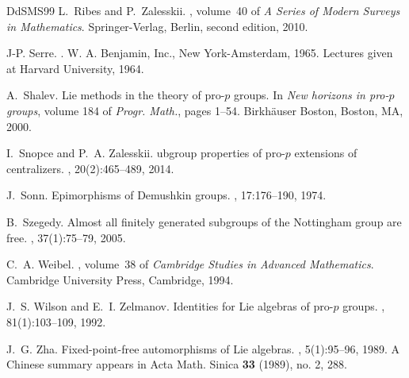 \documentclass[a4paper,10pt]{amsart}
\theoremstyle{plain}
\theoremstyle{definition}
\numberwithin{equation}{section}
\begin{document}
\begin{thebibliography}{DdSMS99}
L.~Ribes and P.~Zalesskii.
, volume~40 of {\em A Series of Modern Surveys in Mathematics}.
\newblock Springer-Verlag, Berlin, second edition, 2010.

J-P. Serre.
.
\newblock W. A. Benjamin, Inc., New York-Amsterdam, 1965.
\newblock Lectures given at Harvard University, 1964.

A.~Shalev.
\newblock Lie methods in the theory of pro-{$p$} groups.
\newblock In {\em New horizons in pro-{$p$} groups}, volume 184 of {\em Progr. Math.}, pages 1--54. Birkh\"auser Boston, Boston, MA, 2000.

I.~Snopce and P.~A. Zalesskii.
ubgroup properties of pro-{$p$} extensions of centralizers.
, 20(2):465--489, 2014.

J.~Sonn.
\newblock Epimorphisms of {D}emushkin groups.
, 17:176--190, 1974.

B.~Szegedy.
\newblock Almost all finitely generated subgroups of the {N}ottingham group are free.
, 37(1):75--79, 2005.

C.~A. Weibel.
, volume~38 of {\em Cambridge Studies in Advanced Mathematics}.
\newblock Cambridge University Press, Cambridge, 1994.

J.~S. Wilson and E.~I. Zelmanov.
\newblock Identities for {L}ie algebras of pro-{$p$} groups.
, 81(1):103--109, 1992.

J.~G. Zha.
\newblock Fixed-point-free automorphisms of {L}ie algebras.
, 5(1):95--96, 1989.
\newblock A Chinese summary appears in Acta Math. Sinica {\bf 33} (1989), no. 2, 288.

\end{thebibliography}
\end{document}
